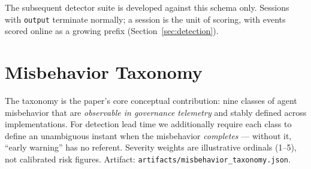 \documentclass[10pt]{article}
\newcommand{\code}[1]{\texttt{#1}}
\begin{document}
\noindent The subsequent detector suite is developed against this schema only.
Sessions with \code{output} terminate normally; a session is the unit of
scoring, with events scored online as a growing prefix
(Section~\ref{sec:detection}).

\section{Misbehavior Taxonomy}
\label{sec:taxonomy}

The taxonomy is the paper's core conceptual contribution: nine classes of
agent misbehavior that are \emph{observable in governance telemetry} and
stably defined across implementations. For detection lead time we additionally
require each class to define an unambiguous instant when the misbehavior
\emph{completes} --- without it, ``early warning'' has no referent. Severity
weights are illustrative ordinals (1--5), not calibrated risk figures.
Artifact: \code{artifacts/misbehavior\_taxonomy.json}.
\end{document}
